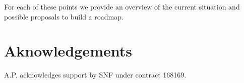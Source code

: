 For each of these points we provide an overview of the current situation and possible proposals to build a roadmap.

%

\section*{Aknowledgements}
A.P. acknowledges support by SNF under contract 168169.